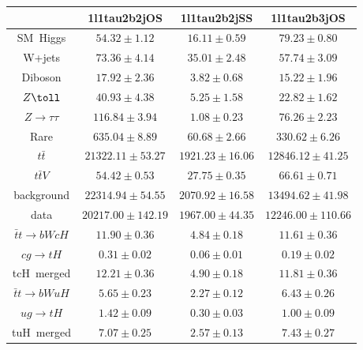 \centering
\begin{tabular}{|c|c|c|c|} \hline
 & 1l1tau2b2jOS & 1l1tau2b2jSS & 1l1tau2b3jOS\\\hline
SM~Higgs & $54.32\pm1.12$ & $16.11\pm0.59$ & $79.23\pm0.80$\\\hline
W+jets & $73.36\pm4.14$ & $35.01\pm2.48$ & $57.74\pm3.09$\\\hline
Diboson & $17.92\pm2.36$ & $3.82\pm0.68$ & $15.22\pm1.96$\\\hline
$Z\toll$ & $40.93\pm4.38$ & $5.25\pm1.58$ & $22.82\pm1.62$\\\hline
$Z\to\tau\tau$ & $116.84\pm3.94$ & $1.08\pm0.23$ & $76.26\pm2.23$\\\hline
Rare & $635.04\pm8.89$ & $60.68\pm2.66$ & $330.62\pm6.26$\\\hline
$t\bar{t}$ & $21322.11\pm53.27$ & $1921.23\pm16.06$ & $12846.12\pm41.25$\\\hline
$t\bar{t}V$ & $54.42\pm0.53$ & $27.75\pm0.35$ & $66.61\pm0.71$\\\hline
background & $22314.94\pm54.55$ & $2070.92\pm16.58$ & $13494.62\pm41.98$\\\hline
data & $20217.00\pm142.19$ & $1967.00\pm44.35$ & $12246.00\pm110.66$\\\hline
$\bar{t}t\to bWcH$ & $11.90\pm0.36$ & $4.84\pm0.18$ & $11.61\pm0.36$\\\hline
$cg\to tH$ & $0.31\pm0.02$ & $0.06\pm0.01$ & $0.19\pm0.02$\\\hline
tcH~merged & $12.21\pm0.36$ & $4.90\pm0.18$ & $11.81\pm0.36$\\\hline
$\bar{t}t\to bWuH$ & $5.65\pm0.23$ & $2.27\pm0.12$ & $6.43\pm0.26$\\\hline
$ug\to tH$ & $1.42\pm0.09$ & $0.30\pm0.03$ & $1.00\pm0.09$\\\hline
tuH~merged & $7.07\pm0.25$ & $2.57\pm0.13$ & $7.43\pm0.27$\\\hline
\end{tabular}
